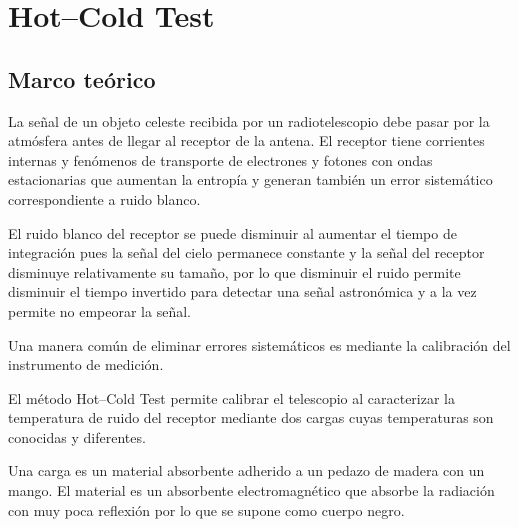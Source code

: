 \section{Hot--Cold Test}\label{sec:hotcoldtest}

\subsection{Marco teórico}

La señal de un objeto celeste recibida por un radiotelescopio debe pasar por la atmósfera antes de llegar al receptor de la antena. El receptor tiene corrientes internas y fenómenos de transporte de electrones y fotones con ondas estacionarias que aumentan la entropía y generan también un error sistemático correspondiente a ruido blanco.

El ruido blanco del receptor se puede disminuir al aumentar el tiempo de integración pues la señal del cielo permanece constante y la señal del receptor disminuye relativamente su tamaño, por lo que disminuir el ruido permite disminuir el tiempo invertido para detectar una señal astronómica y a la vez permite no empeorar la señal.

Una manera común de eliminar errores sistemáticos es mediante la calibración del instrumento de medición.

El método Hot--Cold Test permite calibrar el telescopio al caracterizar la temperatura de ruido del receptor mediante dos cargas cuyas temperaturas son conocidas y diferentes.

Una carga es un material absorbente adherido a un pedazo de madera con un mango. El material es un absorbente electromagnético que absorbe la radiación con muy poca reflexión por lo que se supone como cuerpo negro. %

